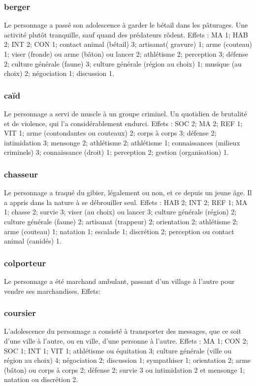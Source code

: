 \documentclass[10pt,a4paper,twocolumn]{book}
\begin{document}
\subsubsection{berger}
Le personnage a passé son adolescence à garder le bétail dans les pâturages. Une activité plutôt tranquille, sauf quand des prédateurs rôdent.
Effets : MA 1; HAB 2; INT 2; CON 1; contact animal (bétail) 3; artisanat( gravure) 1; arme (couteau) 1; viser (fronde) ou arme (bâton) ou lancer 2; athlétisme 2; perception 3; défense 2; culture générale (faune) 3; culture générale (région au choix) 1; musique (au choix) 2; négociation 1; discussion 1.
\subsubsection{caïd}
Le personnage a servi de muscle à un groupe criminel. Un quotidien de brutalité et de violence, qui l’a considérablement endurci.
Effets : SOC 2; MA 2; REF 1; VIT 1; arme (contondantes ou couteaux) 2; corps à corps 3; défense 2; intimidation 3; mensonge 2; athlétisme 2; athlétisme 1; connaissances (milieux criminels) 3; connaissance (droit) 1; perception 2; gestion (organisation) 1.
\subsubsection{chasseur}
Le personnage a traqué du gibier, légalement ou non, et ce depuis un jeune âge. Il a appris dans la nature à se débrouiller seul.
Effets : HAB 2; INT 2; REF 1; MA 1; chasse 2; survie 3; viser (au choix) ou lancer 3; culture générale (région) 2; culture générale (faune) 2; artisanat (trappeur) 2; orientation 2; athlétisme 2; arme (couteau) 1; natation 1; escalade 1; discrétion 2; perception ou contact animal (canidés) 1.
\subsubsection{colporteur}
Le personnage a été marchand ambulant, passant d’un village à l’autre pour vendre ses marchandises.
Effets: 
\subsubsection{coursier}
L’adolescence du personnage a consisté à transporter des messages, que ce soit d’une ville à l’autre, ou en ville, d’une personne à l’autre.
Effets : MA 1; CON 2; SOC 1; INT 1; VIT 1; athlétisme ou équitation 3; culture générale (ville ou région au choix) 4; négociation 2; discussion 1; sympathiser 1; orientation 2; arme (bâton) ou corps à corps 2; défense 2; survie 3 ou intimidation 2 et mensonge 1; natation ou discrétion 2.
\end{document}
